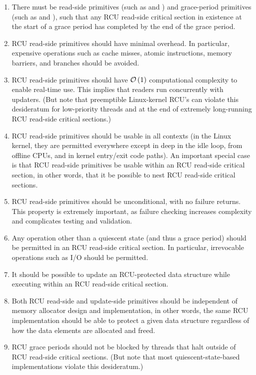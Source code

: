 \begin{enumerate}
\item	There must be read-side primitives (such as 
	and ) and grace-period primitives
	(such as  and ), such
	that any RCU read-side critical section in existence at the
	start of a grace period has completed by the end of the
	grace period.
\item	RCU read-side primitives should have minimal overhead.
	In particular, expensive operations such as cache misses,
	atomic instructions, memory barriers, and branches should
	be avoided.
\item	RCU read-side primitives should have $\mathcal{O}\left(1\right)$ computational
	complexity to enable real-time use.
	This implies that readers run concurrently with updaters.
	(But note that preemptible Linux-kernel RCU's
	 can violate this desideratum for
	low-priority threads and at the end of extremely long-running
	RCU read-side critical sections.)
\item	RCU read-side primitives should be usable in all contexts (in
	the Linux kernel, they are permitted everywhere except in deep
	in the idle loop, from offline CPUs, and in kernel entry/exit
	code paths).
	An important special case is that RCU read-side primitives be
	usable within an RCU read-side critical section, in other words,
	that it be possible to nest RCU read-side critical sections.
\item	RCU read-side primitives should be unconditional, with no
	failure returns.
	This property is extremely important, as failure checking
	increases complexity and complicates testing and validation.
\item	Any operation other than a quiescent state (and thus a grace
	period) should be permitted in an RCU read-side critical section.
	In particular, irrevocable operations such as I/O should be
	permitted.
\item	It should be possible to update an RCU-protected data structure
	while executing within an RCU read-side critical section.
\item	Both RCU read-side and update-side primitives should be independent
	of memory allocator design and implementation, in other words,
	the same RCU implementation should be able to protect a given
	data structure regardless of how the data elements are allocated
	and freed.
\item	RCU grace periods should not be blocked by threads that
	halt outside of RCU read-side critical sections.
	(But note that most quiescent-state-based implementations
	violate this desideratum.)
\end{enumerate}

